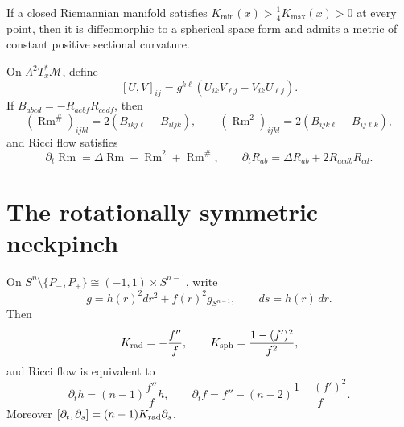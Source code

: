 \begin{theorem}
\label{thm:chow-ii-appd-quarter-pinched-space-form}

If a closed Riemannian manifold satisfies
$K_{\min}(x)>\frac14K_{\max}(x)>0$ at every point, then it is diffeomorphic
to a spherical space form and admits a metric of constant positive sectional
curvature.
\end{theorem}

\begin{definition}
\label{def:chow-ii-appd-curvature-operator-evolution}

On $\Lambda^2T_x^*\mathcal M$, define
\[
 [U,V]_{ij}=g^{k\ell}(U_{ik}V_{\ell j}-V_{ik}U_{\ell j}).
\]
If $B_{abcd}=-R_{aebf}R_{cedf}$, then
\[
 (\operatorname{Rm}^{\#})_{ijkl}=2(B_{ikj\ell}-B_{iljk}),\qquad
 (\operatorname{Rm}^{2})_{ijkl}=2(B_{ijk\ell}-B_{ij\ell k}),
\]
and Ricci flow satisfies
\[
 \partial_t\operatorname{Rm}=\Delta\operatorname{Rm}
   +\operatorname{Rm}^{2}+\operatorname{Rm}^{\#},\qquad
 \partial_tR_{ab}=\Delta R_{ab}+2R_{acdb}R_{cd}.
\]
\end{definition}

\section{The rotationally symmetric neckpinch}

\begin{definition}
\label{def:chow-ii-appd-rotationally-symmetric-flow}

On $S^n\setminus\{P_-,P_+\}\cong(-1,1)\times S^{n-1}$, write
\[
 g=h(r)^2dr^2+f(r)^2g_{S^{n-1}},\qquad ds=h(r)\,dr.
\]
Then
\[
 K_{\rm rad}=-\frac{f''}{f},\qquad
 K_{\rm sph}=\frac{1-(f')^2}{f^2},
\]
and Ricci flow is equivalent to
\[
 \partial_th=(n-1)\frac{f''}{f}h,\qquad
 \partial_tf=f''-(n-2)\frac{1-(f')^2}{f}.
\]
Moreover
$[\partial_t,\partial_s]=(n-1)K_{\rm rad}\partial_s$.
\end{definition}

